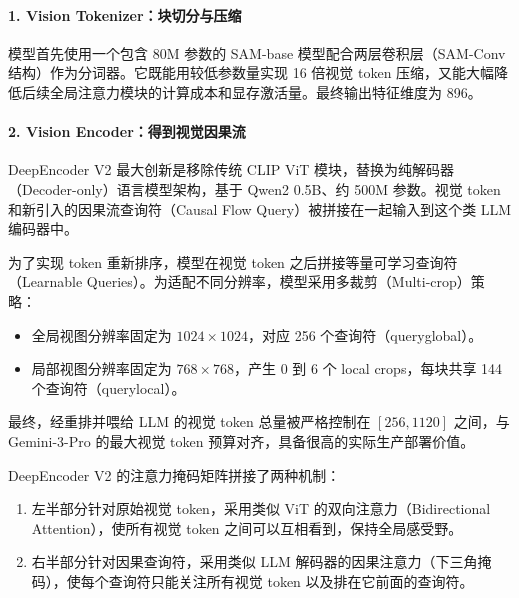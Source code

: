 \hypertarget{vision-tokenizerux5757ux5207ux5206ux4e0eux538bux7f29}{%
\paragraph{1. Vision Tokenizer：块切分与压缩}\label{vision-tokenizerux5757ux5207ux5206ux4e0eux538bux7f29}}

模型首先使用一个包含 80M 参数的 SAM-base 模型配合两层卷积层（SAM-Conv 结构）作为分词器。它既能用较低参数量实现 16 倍视觉 token 压缩，又能大幅降低后续全局注意力模块的计算成本和显存激活量。最终输出特征维度为 896。

\hypertarget{vision-encoderux5f97ux5230ux89c6ux89c9ux56e0ux679cux6d41}{%
\paragraph{2. Vision Encoder：得到视觉因果流}\label{vision-encoderux5f97ux5230ux89c6ux89c9ux56e0ux679cux6d41}}

DeepEncoder V2 最大创新是移除传统 CLIP ViT 模块，替换为纯解码器（Decoder-only）语言模型架构，基于 Qwen2 0.5B、约 500M 参数。视觉 token 和新引入的因果流查询符（Causal Flow Query）被拼接在一起输入到这个类 LLM 编码器中。

为了实现 token 重新排序，模型在视觉 token 之后拼接等量可学习查询符（Learnable Queries）。为适配不同分辨率，模型采用多裁剪（Multi-crop）策略：

\begin{itemize}
\tightlist
\item
  全局视图分辨率固定为 \(1024\times1024\)，对应 256 个查询符（queryglobal）。
\item
  局部视图分辨率固定为 \(768\times768\)，产生 0 到 6 个 local crops，每块共享 144 个查询符（querylocal）。
\end{itemize}

最终，经重排并喂给 LLM 的视觉 token 总量被严格控制在 \([256,1120]\) 之间，与 Gemini-3-Pro 的最大视觉 token 预算对齐，具备很高的实际生产部署价值。

DeepEncoder V2 的注意力掩码矩阵拼接了两种机制：

\begin{enumerate}
\def\labelenumi{\arabic{enumi}.}
\tightlist
\item
  左半部分针对原始视觉 token，采用类似 ViT 的双向注意力（Bidirectional Attention），使所有视觉 token 之间可以互相看到，保持全局感受野。
\item
  右半部分针对因果查询符，采用类似 LLM 解码器的因果注意力（下三角掩码），使每个查询符只能关注所有视觉 token 以及排在它前面的查询符。
\end{enumerate}

